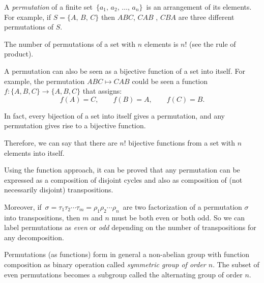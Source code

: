\documentclass{article}
\begin{document}
A \emph{permutation} of a finite set \,$\{a_1,\,a_2,\,\ldots,\,a_n\}$\, is an arrangement of its elements.
For example, if $S=\{A,\,B,\,C\}$ then $A B C$, $C A B$ , $C B A$ are three different permutations of $S$.

The number of permutations of a set with $n$ elements is $n!$ (see the rule of product).

A permutation can also be seen as a bijective function of a set into itself.
For example, the permutation $A B C \mapsto C A B$ could be seen a function $f:\{A,B,C\} \to \{A,B,C\}$ that assigns:
$$f(A)=C,\qquad f(B)=A,\qquad f(C)=B.$$

In fact, every bijection of a set into itself gives a permutation, and any permutation gives rise to  a bijective function.

Therefore, we can say that there are $n!$ bijective functions from a set with $n$ elements into itself.


Using the function approach, it can be proved that any permutation can be expressed as a composition of disjoint cycles and also as composition of (not necessarily disjoint) transpositions.

Moreover, if\, $\sigma=\tau_1\tau_2\cdots\tau_m=\rho_1\rho_2\cdots\rho_n$\, are two factorization of a permutation $\sigma$ into transpositions, then $m$ and $n$ must be both even or both odd. So we can label permutations as \emph{even} or \emph{odd} depending on the number of transpositions for any decomposition.

Permutations (as functions) form in general a non-abelian group with function composition as binary operation called \emph{symmetric group of order $n$}. The subset of even permutations becomes a subgroup called the alternating group of order $n$.
\end{document}
